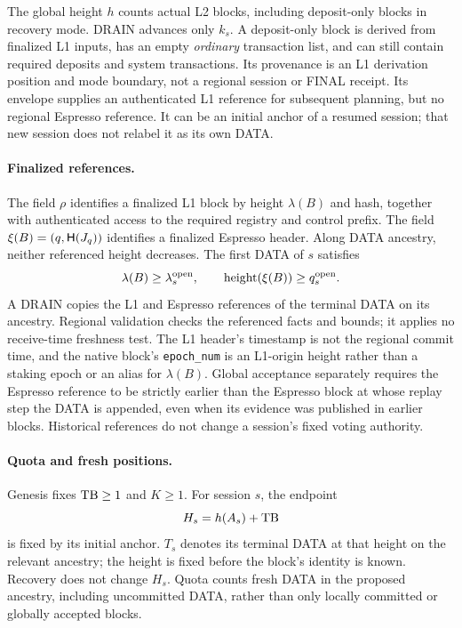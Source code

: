 The global height $h$ counts actual L2 blocks, including deposit-only
blocks in recovery mode. DRAIN advances only $k_s$. A deposit-only block
is derived from finalized L1 inputs, has an empty \emph{ordinary}
transaction list, and can still contain required deposits and system
transactions. Its provenance is an L1 derivation position and mode
boundary, not a regional session or FINAL receipt. Its envelope supplies
an authenticated L1 reference for subsequent planning, but no regional
Espresso reference. It can be an initial anchor of a resumed session;
that new session does not relabel it as its own DATA.

\paragraph{Finalized references.}
The field $\rho$ identifies a finalized L1 block by height $\lambda(B)$
and hash, together with authenticated access to the required registry
and control prefix. The field $\xi(B)=(q,\mathsf H(J_q))$ identifies a
finalized Espresso header. Along DATA ancestry, neither referenced
height decreases. The first DATA of $s$ satisfies
\[
 \lambda(B)\ge\lambda_s^{\rm open},\qquad
 \operatorname{height}(\xi(B))\ge q_s^{\rm open}.
\]
A DRAIN copies the L1 and Espresso references of the terminal DATA on
its ancestry. Regional validation checks the referenced facts and
bounds; it applies no receive-time freshness test. The L1 header's
timestamp is not the regional commit time, and the native block's
\texttt{epoch\_num} is an L1-origin height rather than a staking epoch
or an alias for $\lambda(B)$. Global acceptance separately requires the
Espresso reference to be strictly earlier than the Espresso block at
whose replay step the DATA is appended, even when its evidence was
published in earlier blocks. Historical references do not change a session's
fixed voting authority.

\paragraph{Quota and fresh positions.}
Genesis fixes $\mathrm{TB}\ge1$ and $K\ge1$. For session $s$, the endpoint
\[
 H_s=h(A_s)+\mathrm{TB}
\]
is fixed by its initial anchor. $T_s$ denotes its terminal DATA at that
height on the relevant ancestry; the height is fixed before the block's
identity is known. Recovery does not change $H_s$. Quota counts fresh
DATA in the proposed ancestry, including uncommitted DATA, rather than
only locally committed or globally accepted blocks.

